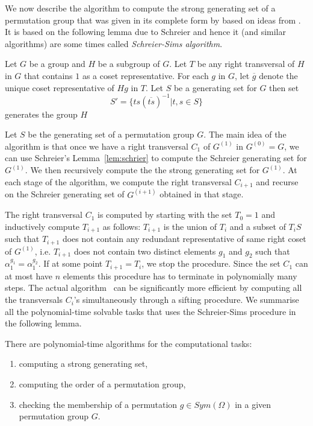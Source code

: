 \documentclass{article}
\begin{document}
We now describe the algorithm to compute the strong generating set of
a permutation group that was given in its complete form by
\citet{furst80polynomialtime} based on ideas from
\citet{sims78some}. It is based on the following lemma due to Schreier
and hence it (and similar algorithms) are some times called
\emph{Schreier-Sims algorithm}.

\begin{lemma} \label{lem:schrier} Let $G$ be a group
  and $H$ be a subgroup of $G$. Let $T$ be any right transversal of
  $H$ in $G$ that contains $1$ as a coset representative. For each $g$
  in $G$, let $\overline{g}$ denote the unique coset representative of
  $Hg$ in $T$. Let $S$ be a generating set for $G$ then set
  \[ S' = \{ t s (\overline{ts})^{-1} | t,s \in S \} \] generates the
  group $H$
\end{lemma}

Let $S$ be the generating set of a permutation group $G$. The main
idea of the algorithm is that once we have a right transversal $C_1$
of $G^{(1)}$ in $G^{(0)} =G$, we can use Schreier's
Lemma~\ref{lem:schrier} to compute the Schreier generating set for
$G^{(1)}$. We then recursively compute the the strong generating set
for $G^{(1)}$. At each stage of the algorithm, we compute the right
transversal $C_{i+1}$ and recurse on the Schreier generating set of
$G^{(i+1)}$ obtained in that stage.

The right transversal $C_1$ is computed by starting with the set $T_0
= 1$ and inductively compute $T_{i+1}$ as follows: $T_{i+1}$ is the
union of $T_i$ and a subset of $T_iS$ such that $T_{i+1}$ does not
contain any redundant representative of same right coset of $G^{(1)}$,
i.e.  $T_{i+1}$ does not contain two distinct elements $g_1$ and $g_2$
such that $\alpha_1^{g_1}= \alpha_1^{g_2}$. If at some point $T_{i+1}
= T_i$, we stop the procedure. Since the set $C_1$ can at most have
$n$ elements this procedure has to terminate in polynomially many
steps. The actual algorithm~\cite{furst80polynomialtime} can be
significantly more efficient by computing all the transversals $C_i$'s
simultaneously through a sifting procedure. We summarise all the
polynomial-time solvable tasks that uses the Schreier-Sims procedure
in the following lemma.

\begin{lemma}
  \label{lem:order_member_subgrp_cal}
  There are polynomial-time algorithms for the computational tasks:

  \begin{enumerate}
  \item computing a strong generating set,
  \item computing the order of a permutation group,
  \item checking the membership of a permutation $g \in Sym(\Omega)$ in
    a given permutation group $G$.
  \end{enumerate}

\end{lemma}
\end{document}
